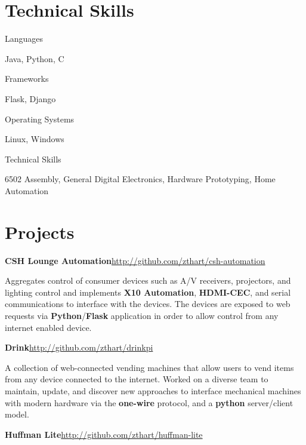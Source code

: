 \documentclass[margin,line]{resume}
\newcommand{\rurl}[1]{\hfill {\footnotesize \url{#1}}}
\begin{document}
\begin{resume}
\section{\mysidestyle Technical Skills}
	\begin{compactdesc}
		\item[Languages] \begin{inparaenum} { \small
			Java, Python, C
		} \end{inparaenum}
        \item[Frameworks] \begin{inparaenum} { \small
        	Flask, Django
        } \end{inparaenum}
		\item[Operating Systems] \begin{inparaenum} { \small
			Linux, Windows
		} \end{inparaenum}
        \item[Technical Skills] \begin{inparaenum} { \small
			6502 Assembly, General Digital Electronics, Hardware Prototyping, Home Automation
        } \end{inparaenum}
        \normalsize
	\end{compactdesc}

\section{\mysidestyle Projects}
	\begin{asparablank}
		\item {\bf CSH Lounge Automation}\rurl{http://github.com/zthart/csh-automation}

		\small Aggregates control of consumer devices such as A/V receivers, projectors, and lighting control and implements \textbf{X10 Automation}, \textbf{HDMI-CEC}, and serial communications to interface with the devices. The devices are exposed to web requests via \textbf{Python}/\textbf{Flask} application in order to allow control from any internet enabled device.
		\normalsize
        \\
        \item {\bf Drink}\rurl{http://github.com/zthart/drinkpi}
        
        \small A collection of web-connected vending machines that allow users to vend items from any device connected to the internet. Worked on a diverse team to maintain, update, and discover new approaches to interface mechanical machines with modern hardware via the \textbf{one-wire} protocol, and a \textbf{python} server/client model.
        \normalsize
		\\
		\item {\bf Huffman Lite}\rurl{http://github.com/zthart/huffman-lite}
		

\end{asparablank}
\end{resume}
\end{document}
